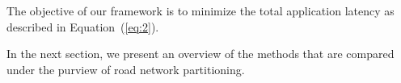 

The objective of our framework is to minimize the total application
latency as described in Equation~(\ref{eq:2}).

In the next section, we present an overview of the methods that are compared under the purview of road network partitioning.
